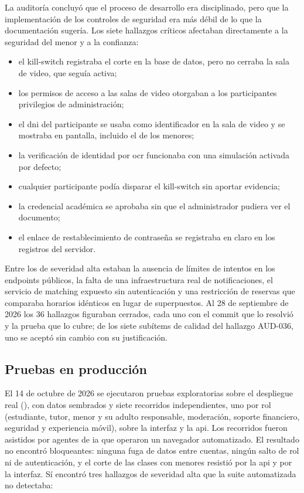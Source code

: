 La auditoría concluyó que el proceso de desarrollo era disciplinado,
pero que la implementación de los controles de seguridad era más débil
de lo que la documentación sugería. Los siete hallazgos críticos
afectaban directamente a la seguridad del menor y a la confianza:

\begin{itemize}
    \item el kill-switch registraba el corte en la base de datos, pero no
          cerraba la sala de video, que seguía activa;
    \item los permisos de acceso a las salas de video otorgaban a los
          participantes privilegios de administración;
    \item el \gls{dni} del participante se usaba como identificador en la
          sala de video y se mostraba en pantalla, incluido el de los
          menores;
    \item la verificación de identidad por \gls{ocr} funcionaba con una
          simulación activada por defecto;
    \item cualquier participante podía disparar el kill-switch sin
          aportar evidencia;
    \item la credencial académica se aprobaba sin que el administrador
          pudiera ver el documento;
    \item el enlace de restablecimiento de contraseña se registraba en
          claro en los registros del servidor.
\end{itemize}

Entre los de severidad alta estaban la ausencia de límites de intentos
en los endpoints públicos, la falta de una infraestructura real de
notificaciones, el servicio de \gls{matching} expuesto sin autenticación
y una restricción de reservas que comparaba horarios idénticos en lugar
de superpuestos. Al 28 de septiembre de 2026 los 36 hallazgos figuraban
cerrados, cada uno con el commit que lo resolvió y la prueba que lo
cubre; de los siete subítems de calidad del hallazgo AUD-036, uno se
aceptó sin cambio con su justificación.

\subsection{Pruebas en producción}\label{sec:pruebas-produccion}

El 14 de octubre de 2026 se ejecutaron pruebas exploratorias sobre el
despliegue real (), con datos sembrados y siete
recorridos independientes, uno por rol (estudiante, tutor, menor y su
adulto responsable, moderación, soporte financiero, seguridad y
experiencia móvil), sobre la interfaz y la \gls{api}. Los recorridos
fueron asistidos por agentes de \gls{ia} que operaron un navegador
automatizado. El resultado no encontró bloqueantes: ninguna fuga de datos
entre cuentas, ningún salto de rol ni de autenticación, y el corte de las
clases con menores resistió por la \gls{api} y por la interfaz. Sí
encontró tres hallazgos de severidad alta que la suite automatizada no
detectaba:

